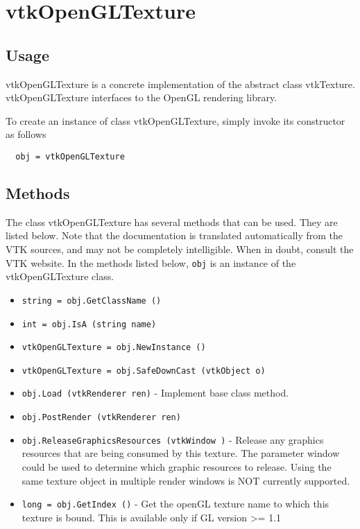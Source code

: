 \section{vtkOpenGLTexture}

\subsection{Usage}

 vtkOpenGLTexture is a concrete implementation of the abstract class 
 vtkTexture. vtkOpenGLTexture interfaces to the OpenGL rendering library.

To create an instance of class vtkOpenGLTexture, simply
invoke its constructor as follows
\begin{verbatim}
  obj = vtkOpenGLTexture
\end{verbatim}
\subsection{Methods}

The class vtkOpenGLTexture has several methods that can be used.
  They are listed below.
Note that the documentation is translated automatically from the VTK sources,
and may not be completely intelligible.  When in doubt, consult the VTK website.
In the methods listed below, \verb|obj| is an instance of the vtkOpenGLTexture class.
\begin{itemize}
\item  \verb|string = obj.GetClassName ()|

\item  \verb|int = obj.IsA (string name)|

\item  \verb|vtkOpenGLTexture = obj.NewInstance ()|

\item  \verb|vtkOpenGLTexture = obj.SafeDownCast (vtkObject o)|

\item  \verb|obj.Load (vtkRenderer ren)| -  Implement base class method.

\item  \verb|obj.PostRender (vtkRenderer ren)|

\item  \verb|obj.ReleaseGraphicsResources (vtkWindow )| -  Release any graphics resources that are being consumed by this texture.
 The parameter window could be used to determine which graphic
 resources to release. Using the same texture object in multiple
 render windows is NOT currently supported. 

\item  \verb|long = obj.GetIndex ()| -  Get the openGL texture name to which this texture is bound.
 This is available only if GL version >= 1.1

\end{itemize}
